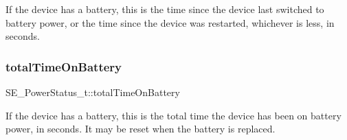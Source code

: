 If the device has a battery, this is the time since the device last switched to battery power, or the time since the device was restarted, whichever is less, in seconds. \mbox{\label{group__PowerStatus_ga06d7be370852bb6cf390fbcc0097a239}} 
\subsubsection{\texorpdfstring{total\+Time\+On\+Battery}{totalTimeOnBattery}}
{\footnotesize\ttfamily S\+E\+\_\+\+Power\+Status\+\_\+t\+::total\+Time\+On\+Battery}

If the device has a battery, this is the total time the device has been on battery power, in seconds. It may be reset when the battery is replaced. 